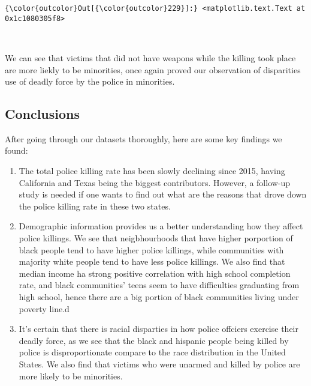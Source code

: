 \documentclass[11pt]{article}
\providecommand{\tightlist}{%
      \setlength{\itemsep}{0pt}\setlength{\parskip}{0pt}}
\begin{document}
\begin{Verbatim}[commandchars=\\\{\}]
{\color{outcolor}Out[{\color{outcolor}229}]:} <matplotlib.text.Text at 0x1c1080305f8>
\end{Verbatim}
            
    \begin{center}
    \end{center}
    { \hspace*{\fill} \\}
    
    We can see that victims that did not have weapons while the killing took
place are more liekly to be minorities, once again proved our
observation of disparities use of deadly force by the police in
minorities.

    \subsection{Conclusions}\label{conclusions}

    After going through our datasets thoroughly, here are some key findings
we found:

\begin{enumerate}
\def\labelenumi{\arabic{enumi}.}
\tightlist
\item
  The total police killing rate has been slowly declining since 2015,
  having California and Texas being the biggest contributors. However, a
  follow-up study is needed if one wants to find out what are the
  reasons that drove down the police killing rate in these two states.
\item
  Demographic information provides us a better understanding how they
  affect police killings. We see that neigbhourhoods that have higher
  porportion of black people tend to have higher police killings, while
  communities with majority white people tend to have less police
  killings. We also find that median income ha strong positive
  correlation with high school completion rate, and black communities'
  teens seem to have difficulties graduating from high school, hence
  there are a big portion of black communities living under poverty
  line.d
\item
  It's certain that there is racial disparties in how police offciers
  exercise their deadly force, as we see that the black and hispanic
  people being killed by police is disproportionate compare to the race
  distribution in the United States. We also find that victims who were
  unarmed and killed by police are more likely to be minorities.
\end{enumerate}


    
    
    
    
\end{document}
